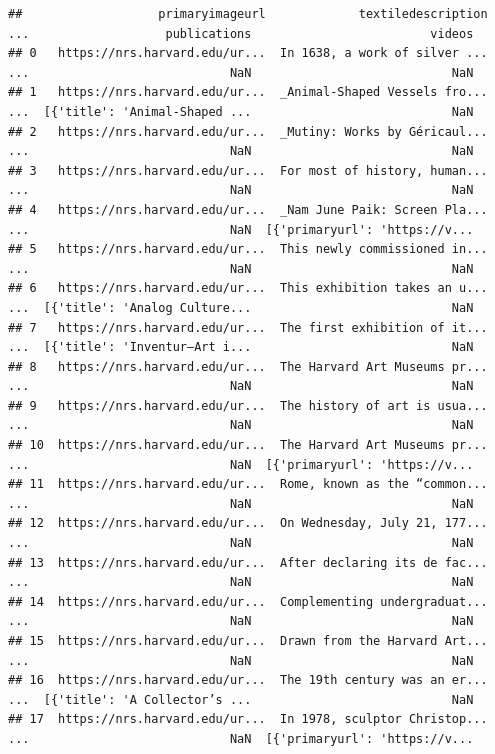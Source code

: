 \documentclass[]{book}
\begin{document}
\begin{verbatim}
##                   primaryimageurl             textiledescription  ...                   publications                         videos
## 0   https://nrs.harvard.edu/ur...  In 1638, a work of silver ...  ...                            NaN                            NaN
## 1   https://nrs.harvard.edu/ur...  _Animal-Shaped Vessels fro...  ...  [{'title': 'Animal-Shaped ...                            NaN
## 2   https://nrs.harvard.edu/ur...  _Mutiny: Works by Géricaul...  ...                            NaN                            NaN
## 3   https://nrs.harvard.edu/ur...  For most of history, human...  ...                            NaN                            NaN
## 4   https://nrs.harvard.edu/ur...  _Nam June Paik: Screen Pla...  ...                            NaN  [{'primaryurl': 'https://v...
## 5   https://nrs.harvard.edu/ur...  This newly commissioned in...  ...                            NaN                            NaN
## 6   https://nrs.harvard.edu/ur...  This exhibition takes an u...  ...  [{'title': 'Analog Culture...                            NaN
## 7   https://nrs.harvard.edu/ur...  The first exhibition of it...  ...  [{'title': 'Inventur—Art i...                            NaN
## 8   https://nrs.harvard.edu/ur...  The Harvard Art Museums pr...  ...                            NaN                            NaN
## 9   https://nrs.harvard.edu/ur...  The history of art is usua...  ...                            NaN                            NaN
## 10  https://nrs.harvard.edu/ur...  The Harvard Art Museums pr...  ...                            NaN  [{'primaryurl': 'https://v...
## 11  https://nrs.harvard.edu/ur...  Rome, known as the “common...  ...                            NaN                            NaN
## 12  https://nrs.harvard.edu/ur...  On Wednesday, July 21, 177...  ...                            NaN                            NaN
## 13  https://nrs.harvard.edu/ur...  After declaring its de fac...  ...                            NaN                            NaN
## 14  https://nrs.harvard.edu/ur...  Complementing undergraduat...  ...                            NaN                            NaN
## 15  https://nrs.harvard.edu/ur...  Drawn from the Harvard Art...  ...                            NaN                            NaN
## 16  https://nrs.harvard.edu/ur...  The 19th century was an er...  ...  [{'title': 'A Collector’s ...                            NaN
## 17  https://nrs.harvard.edu/ur...  In 1978, sculptor Christop...  ...                            NaN  [{'primaryurl': 'https://v...

\end{verbatim}
\end{document}
